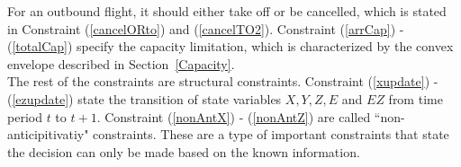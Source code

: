 \documentclass[12pt]{article}
\begin{document}
	\newline
	For an outbound flight, it should either take off or be cancelled, which is stated in Constraint (\ref{cancelORto}) and (\ref{cancelTO2}). Constraint (\ref{arrCap}) - (\ref{totalCap}) specify the capacity limitation, which is characterized by the convex envelope described in Section~\ref{Capacity}.\\
	\newline
	The rest of the constraints are structural constraints. Constraint (\ref{xupdate}) - (\ref{ezupdate}) state the transition of state variables \(X, Y, Z, E\) and \(EZ\) from time period \(t\) to \(t+1\). Constraint (\ref{nonAntX}) - (\ref{nonAntZ}) are called ``non-anticipitivatiy" constraints. These are a type of important constraints that state the decision can only be made based on the known information.  
	
\end{document}
